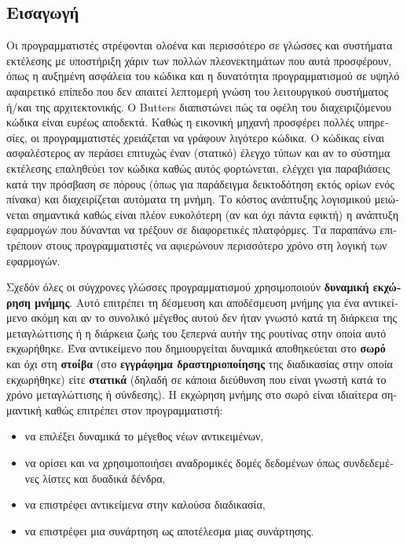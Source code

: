 \begin{greek}
\chapter{Εισαγωγή}\label{ch:intro}

Οι προγραμματιστές στρέφονται ολοένα και περισσότερο σε γλώσσες
και συστήματα εκτέλεσης με υποστήριξη χάριν των πολλών πλεονεκτημάτων
που αυτά προσφέρουν, όπως η αυξημένη ασφάλεια του κώδικα και
η δυνατότητα προγραμματισμού σε υψηλό αφαιρετικό επίπεδο που δεν
απαιτεί λεπτομερή γνώση του λειτουργικού συστήματος ή/και της
αρχιτεκτονικής. Ο Butters \cite{butt07} διαπιστώνει πώς τα οφέλη
του διαχειριζόμενου κώδικα είναι ευρέως αποδεκτά. Καθώς η εικονική
μηχανή προσφέρει πολλές υπηρεσίες, οι προγραμματιστές χρειάζεται
να γράφουν λιγότερο κώδικα. Ο κώδικας είναι ασφαλέστερος αν περάσει
επιτυχώς έναν (στατικό) έλεγχο τύπων και αν το σύστημα εκτέλεσης
επαληθεύει τον κώδικα καθώς αυτός φορτώνεται, ελέγχει για παραβιάσεις
κατά την πρόσβαση σε πόρους (όπως για παράδειγμα δεικτοδότηση εκτός
ορίων ενός πίνακα) και διαχειρίζεται αυτόματα τη μνήμη. Το κόστος
ανάπτυξης λογισμικού μειώνεται σημαντικά καθώς είναι πλέον ευκολότερη
(αν και όχι πάντα εφικτή) η ανάπτυξη εφαρμογών που δύνανται να
τρέξουν σε διαφορετικές πλατφόρμες. Τα παραπάνω επιτρέπουν στους
προγραμματιστές να αφιερώνουν περισσότερο χρόνο στη λογική των
εφαρμογών.

Σχεδόν όλες οι σύγχρονες γλώσσες προγραμματισμού χρησιμοποιούν
\textbf{δυναμική εκχώρηση μνήμης}. Αυτό επιτρέπει τη δέσμευση
και αποδέσμευση μνήμης για ένα αντικείμενο ακόμη και αν το συνολικό
μέγεθος αυτού δεν ήταν γνωστό κατά τη διάρκεια της μεταγλώττισης
ή η διάρκεια ζωής του ξεπερνά αυτήν της ρουτίνας στην οποία
αυτό εκχωρήθηκε. Ένα αντικείμενο που δημιουργείται δυναμικά
αποθηκεύεται στο \textbf{σωρό} και όχι στη \textbf{στοίβα}
(στο \textbf{εγγράφημα δραστηριοποίησης} της διαδικασίας στην
οποία εκχωρήθηκε) είτε \textbf{στατικά} (δηλαδή σε κάποια διεύθυνση
που είναι γνωστή κατά το χρόνο μεταγλώττισης ή σύνδεσης). Η
εκχώρηση μνήμης στο σωρό είναι ιδιαίτερα σημαντική καθώς επιτρέπει
στον προγραμματιστή:

\begin{itemize}
\item να επιλέξει δυναμικά το μέγεθος νέων αντικειμένων,
\item να ορίσει και να χρησιμοποιήσει αναδρομικές δομές δεδομένων 
      όπως συνδεδεμένες λίστες και δυαδικά δένδρα,
\item να επιστρέφει αντικείμενα στην καλούσα διαδικασία,
\item να επιστρέφει μια συνάρτηση ως αποτέλεσμα μιας συνάρτησης.
\end{itemize}


\end{greek}
